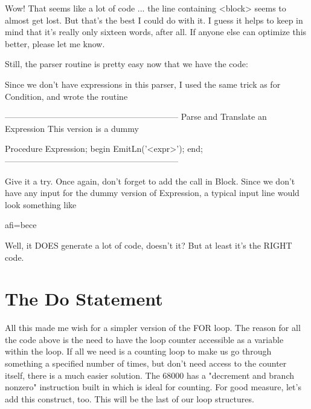 \documentclass[float=false, crop=false]{standalone}
\begin{document}
Wow! That seems like a lot of code ... the line containing <block> seems to
almost get lost. But that's the best I could do with it. I guess it helps to
keep in mind that it's really only sixteen words, after all. If anyone else can
optimize this better, please let me know.

Still, the parser routine is pretty easy now that we have the code:


Since we don't have expressions in this parser, I used the same trick as for
Condition, and wrote the routine

\begin{code}
{--------------------------------------------------------------}
{ Parse and Translate an Expression }
{ This version is a dummy }

Procedure Expression;
begin
   EmitLn('<expr>');
end;
{--------------------------------------------------------------}
\end{code}

Give it a try. Once again, don't forget to add the call in Block. Since we don't
have any input for the dummy version of Expression, a typical input line would
look something like

     afi=bece

Well, it DOES generate a lot of code, doesn't it? But at least it's the RIGHT
code.


\section{The Do Statement}

All this made me wish for a simpler version of the FOR loop. The reason for all
the code above is the need to have the loop counter accessible as a variable
within the loop. If all we need is a counting loop to make us go through
something a specified number of times, but don't need access to the counter
itself, there is a much easier solution. The 68000 has a "decrement and branch
nonzero" instruction built in which is ideal for counting. For good measure,
let's add this construct, too. This will be the last of our loop structures.
\end{document}
